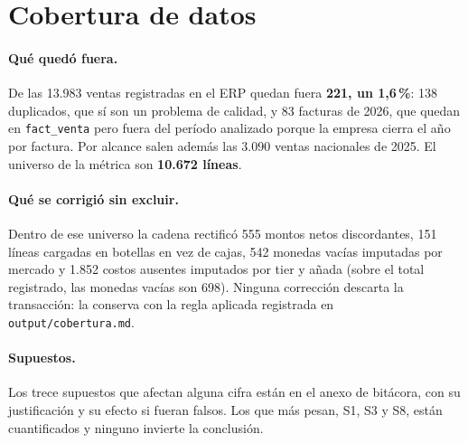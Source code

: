 
\section{Cobertura de datos}

\paragraph{Qué quedó fuera.} De las 13.983 ventas registradas en el ERP quedan fuera \textbf{221, un 1,6\,\%}: 138 duplicados, que sí son un problema de calidad, y 83 facturas de 2026, que quedan en \texttt{fact\_venta} pero fuera del período analizado porque la empresa cierra el año por factura. Por alcance salen además las 3.090 ventas nacionales de 2025. El universo de la métrica son \textbf{10.672 líneas}.

\paragraph{Qué se corrigió sin excluir.} Dentro de ese universo la cadena rectificó 555 montos netos discordantes, 151 líneas cargadas en botellas en vez de cajas, 542 monedas vacías imputadas por mercado y 1.852 costos ausentes imputados por tier y añada (sobre el total registrado, las monedas vacías son 698). Ninguna corrección descarta la transacción: la conserva con la regla aplicada registrada en \texttt{output/cobertura.md}.

\paragraph{Supuestos.} Los trece supuestos que afectan alguna cifra están en el anexo de bitácora, con su justificación y su efecto si fueran falsos. Los que más pesan, S1, S3 y S8, están cuantificados y ninguno invierte la conclusión.
